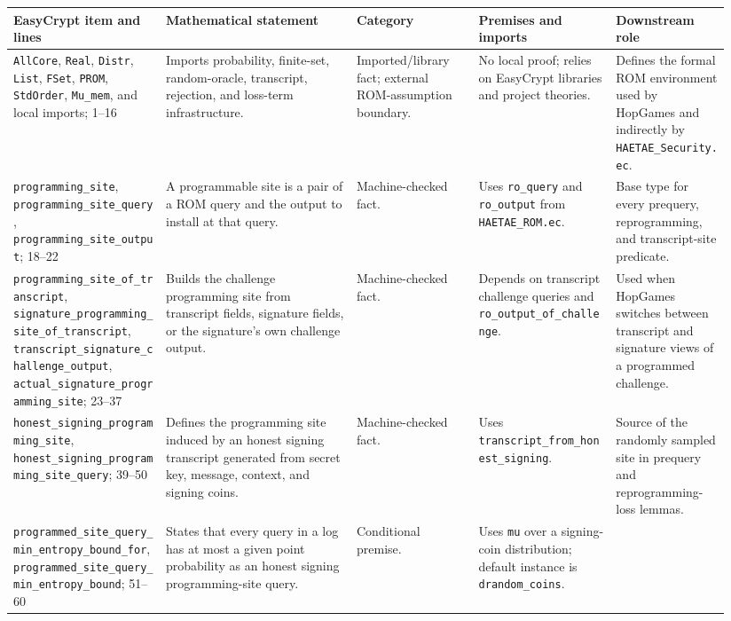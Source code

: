 \documentclass[11pt]{report}
\DeclareRobustCommand{\file}[1]{\ifmmode\text{\nolinkurl{#1}}\else\nolinkurl{#1}\fi}
\DeclareRobustCommand{\ec}[1]{\ifmmode\text{\nolinkurl{#1}}\else\nolinkurl{#1}\fi}
\theoremstyle{definition}
\theoremstyle{plain}
\begin{document}
\begin{longtable}{p{0.20\linewidth}p{0.25\linewidth}p{0.16\linewidth}p{0.18\linewidth}p{0.15\linewidth}}
\toprule
\textbf{EasyCrypt item and lines} & \textbf{Mathematical statement} &
\textbf{Category} & \textbf{Premises and imports} & \textbf{Downstream role} \\
\midrule
\ec{AllCore}, \ec{Real}, \ec{Distr}, \ec{List}, \ec{FSet},
\ec{PROM}, \ec{StdOrder}, \ec{Mu\_mem}, and local imports; 1--16 &
Imports probability, finite-set, random-oracle, transcript, rejection, and
loss-term infrastructure. &
Imported/library fact; external ROM-assumption boundary. &
No local proof; relies on EasyCrypt libraries and project theories. &
Defines the formal ROM environment used by HopGames and indirectly by
\file{HAETAE\_Security.ec}. \\
\midrule
\ec{programming\_site}, \ec{programming\_site\_query},
\ec{programming\_site\_output}; 18--22 &
A programmable site is a pair of a ROM query and the output to install at that
query. &
Machine-checked fact. &
Uses \ec{ro\_query} and \ec{ro\_output} from \file{HAETAE\_ROM.ec}. &
Base type for every prequery, reprogramming, and transcript-site predicate. \\
\midrule
\ec{programming\_site\_of\_transcript},
\ec{signature\_programming\_site\_of\_transcript},
\ec{transcript\_signature\_challenge\_output},
\ec{actual\_signature\_programming\_site}; 23--37 &
Builds the challenge programming site from transcript fields, signature fields,
or the signature's own challenge output. &
Machine-checked fact. &
Depends on transcript challenge queries and \ec{ro\_output\_of\_challenge}. &
Used when HopGames switches between transcript and signature views of a
programmed challenge. \\
\midrule
\ec{honest\_signing\_programming\_site},
\ec{honest\_signing\_programming\_site\_query}; 39--50 &
Defines the programming site induced by an honest signing transcript generated
from secret key, message, context, and signing coins. &
Machine-checked fact. &
Uses \ec{transcript\_from\_honest\_signing}. &
Source of the randomly sampled site in prequery and reprogramming-loss lemmas. \\
\midrule
\ec{programmed\_site\_query\_min\_entropy\_bound\_for},
\ec{programmed\_site\_query\_min\_entropy\_bound}; 51--60 &
States that every query in a log has at most a given point probability as an
honest signing programming-site query. &
Conditional premise. &
Uses \ec{mu} over a signing-coin distribution; default instance is
\ec{drandom\_coins}. &

\end{longtable}
\end{document}

